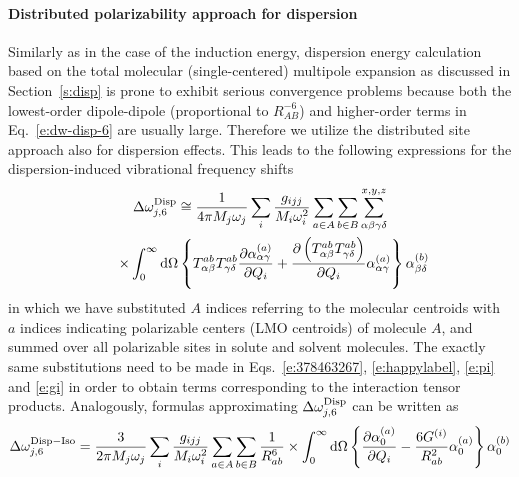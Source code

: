 \documentclass[a4paper,titlepage,twoside,fleqn,12pt]{book}
\begin{document}
\begin{refsection}
\paragraph{Distributed polarizability approach for dispersion}
Similarly as in the case of the induction energy, 
dispersion energy calculation based on the total molecular (single\hyp{}centered)
multipole expansion as discussed in Section~\ref{s:disp} 
is prone to exhibit serious convergence problems because
both the lowest\hyp{}order 
dipole\hyp{}dipole (proportional to $R^{-6}_{AB}$) 
and higher\hyp{}order terms in Eq.~\eqref{e:dw-disp-6} 
are usually large. Therefore we utilize the distributed site 
approach also for dispersion effects.\citep{Adamovic.Gordon.MolPhys.2005}
This leads to the following expressions for the 
dispersion\hyp{}induced vibrational frequency shifts 
%
\begin{multline} \label{e:dw-disp-6-distr-working}
    \Delta\omega_{j,6}^{\rm Disp} \cong 
       \frac{1}{4\pi M_j\omega_j}\sum_i \frac{g_{ijj}}{M_i\omega_i^2} 
       \sum_{a\in  A}\sum_{b\in B}
       \sum_{\alpha\beta\gamma\delta}^{x,y,z}  \\ 
    \qquad \times \int_{0}^{\infty} {\rm d}\Omega
       \left\{
         T^{ab}_{\alpha\beta}T^{ab}_{\gamma\delta}
           \frac{\partial \alpha_{\alpha\gamma}^{(a)}}{\partial Q_i}
            +
           \frac{\partial \left(T^{ab}_{\alpha\beta}T^{ab}_{\gamma\delta}\right)}{\partial Q_i}
          \alpha_{\alpha\gamma}^{(a)}
      \right\}
      \alpha_{\beta\delta}^{(b)}   
\end{multline}
%
in which we have substituted $A$ indices referring to the molecular centroids
with $a$ indices indicating polarizable centers (LMO centroids) 
of molecule $A$, and summed over all polarizable sites in solute
and solvent molecules. The exactly same substitutions need to be made
in Eqs.~\eqref{e:378463267}, \eqref{e:happylabel}, \eqref{e:pi}  and \eqref{e:gi}
in order to obtain terms corresponding to the interaction tensor products.
Analogously, formulas approximating $\Delta\omega_{j,6}^{\rm Disp}$ 
can be written as
%
\begin{equation} \label{e:dw-disp-6-iso-distributed}
\Delta \omega_{j,6}^{\rm Disp-Iso} = \frac{3}{2\pi M_j\omega_j}
\sum_i \frac{g_{ijj}}{M_i\omega_i^2} 
\sum_{a\in  A}\sum_{b\in B}
\frac{1}{R^6_{ab}} \times
\int_{0}^{\infty} {\rm d}\Omega \left\{ 
\frac{\partial \alpha_0^{(a)}}{\partial Q_i}- 
\frac{6G^{(i)}}{R^2_{ab}} 
\alpha_0^{(a)}
\right\}
\alpha_0^{(b)} 
\end{equation}

\end{refsection}
\end{document}
